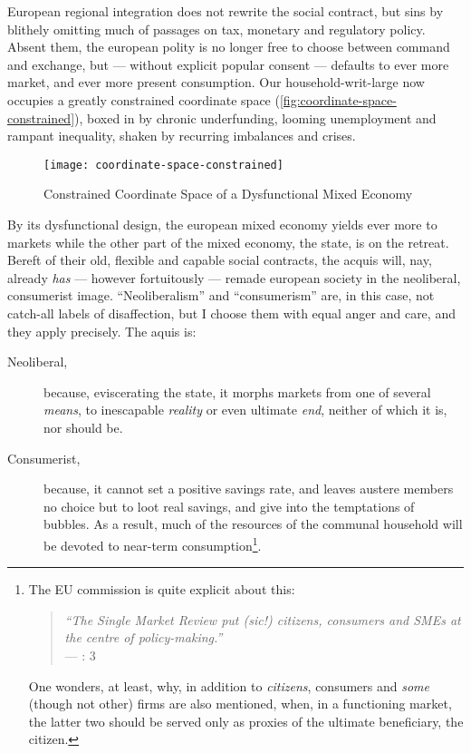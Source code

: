 European regional integration does not rewrite the social contract, but sins by blithely omitting much of passages on tax, monetary and regulatory policy. Absent them, the european polity is no longer free to choose between %
command and exchange, but --- without explicit popular consent --- defaults to ever more market, and ever more present consumption. Our household-writ-large now occupies a greatly constrained coordinate space (\autoref{fig:coordinate-space-constrained}), boxed in by chronic underfunding,  looming unemployment and rampant inequality, shaken by recurring imbalances and crises. 

\begin{figure}[htbp]
	\begin{center}
	\texttt{[image: coordinate-space-constrained]}  
	\caption{Constrained Coordinate Space of a Dysfunctional Mixed Economy}
	\label{fig:coordinate-space-constrained}
	\end{center}
\end{figure}

By its dysfunctional design, the european mixed economy yields ever more to markets while the other part of the mixed economy, the state, is on the retreat. Bereft of their old, flexible and capable social contracts, the acquis will, nay, already \emph{has} --- however fortuitously --- remade european society in the neoliberal, consumerist image. ``Neoliberalism'' and ``consumerism'' are, in this case, not catch-all labels of disaffection, but I choose them with equal anger and care, and they apply precisely. The aquis is:
\begin{description}
	\item[Neoliberal,] because, eviscerating the state, it morphs markets from one of several \emph{means}, to inescapable \emph{reality} or even ultimate \emph{end}, neither of which it is, nor should be.
	\item[Consumerist,] because, it cannot set a positive savings rate, and leaves austere members no choice but to loot real savings, and give into the temptations of bubbles. As a result, much of the resources of the communal household will be devoted to near-term consumption\footnote{
		The \gls{EU} commission is quite explicit about this:
			\begin{quote}
				\emph{``The Single Market Review put \emph{(sic!)} citizens, consumers and \glspl{SME} at the centre of policy-making.''}\\
				--- \citealt{Commission2008}: 3	 
			\end{quote} 
		One wonders, at least, why, in addition to \emph{citizens}, consumers and \emph{some} (though not other) firms are also mentioned, when, in a functioning market, the latter two should be served only as proxies of the ultimate beneficiary, the citizen.}.
	
\end{description}

